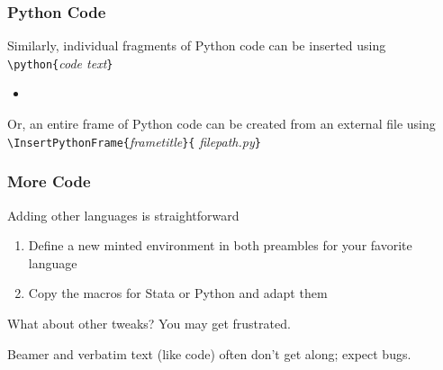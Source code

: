 \documentclass[aspectratio=169,handout]{beamer}
\begin{document}
\begin{frame}
	\frametitle{Python Code}
	\begin{witem}
		\item Similarly, individual fragments of Python code can be
			inserted using \texttt{\textbackslash{}python\{}\textit{code text}\texttt{\}}
			\begin{itemize}
				\item {}
			\end{itemize}
		\item Or, an entire frame of Python code can be created from an external file
			using
			\texttt{\textbackslash{}InsertPythonFrame\{}\textit{frametitle}\texttt{\}\{}
\textit{filepath.py}\texttt{\}}
	\end{witem}
\end{frame}






\begin{frame}
	\frametitle{More Code}
	\begin{witem}
		\item Adding other languages is straightforward
			\begin{enumerate}
				\item Define a new minted environment
					in both preambles for your favorite language
				\item Copy the macros for Stata or Python and adapt them
			\end{enumerate}
		\item What about other tweaks? You may get frustrated.
		\item Beamer and verbatim text (like code) often don't get along; expect bugs.
	\end{witem}
\end{frame}




\end{document}
